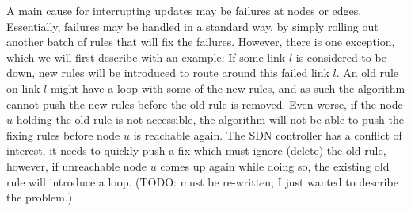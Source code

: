 A main cause for interrupting updates may be failures at nodes or edges. Essentially, failures may be handled in a standard way, by simply rolling out another batch of rules that will fix the failures. However, there is one exception, which we will first describe with an example: If some link $l$ is considered to be down, new rules will be introduced to route around this failed link $l$. An old rule on link $l$ might have a loop with some of the new rules, and as such the algorithm cannot push the new rules before the old rule is removed. Even worse, if the node $u$ holding the old rule is not accessible, the algorithm will not be able to push the fixing rules before node $u$ is reachable again. The SDN controller has a conflict of interest, it needs to quickly push a fix which must ignore (delete) the old rule, however, if unreachable node $u$ comes up again while doing so, the existing old rule will introduce a loop. (TODO: must be re-written, I just wanted to describe the problem.)


